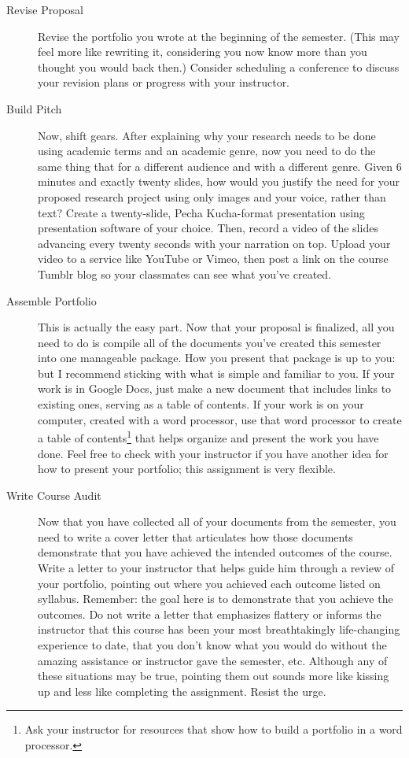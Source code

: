 \documentclass[11pt,oneside]{amsart}	%
\begin{document}
\begin{description}
	\item[Revise Proposal] Revise the portfolio you wrote at the beginning of the semester. (This may feel more like rewriting it, considering you now know more than you thought you would back then.) Consider scheduling a conference to discuss your revision plans or progress with your instructor.
	\item[Build Pitch] Now, shift gears. After explaining why your research needs to be done using academic terms and an academic genre, now you need to do the same thing that for a different audience and with a different genre. Given 6\textonehalf{} minutes and exactly twenty slides, how would you justify the need for your proposed research project using only images and your voice, rather than text? Create a twenty-slide, Pecha Kucha-format presentation using presentation software of your choice. Then, record a video of the slides advancing every twenty seconds with your narration on top. Upload your video to a service like YouTube or Vimeo, then post a link on the course Tumblr blog so your classmates can see what you've created.
	\item[Assemble Portfolio]  This is actually the easy part. Now that your proposal is finalized, all you need to do is compile all of the documents you've created this semester into one manageable package. How you present that package is up to you: but I recommend sticking with what is simple and familiar to you. If your work is in Google Docs, just make a new document that includes links to existing ones, serving as a table of contents. If your work is on your computer, created with a word processor, use that word processor to create a table of contents\footnote{Ask your instructor for resources that show how to build a portfolio in a word processor.} that helps organize and present the work you have done. Feel free to check with your instructor if you have another idea for how to present your portfolio; this assignment is very flexible.
	\item[Write Course Audit] Now that you have collected all of your documents from the semester, you need to write a cover letter that articulates how those documents demonstrate that you have achieved the intended outcomes of the course. Write a letter to your instructor that helps guide him through a review of your portfolio, pointing out where you achieved each outcome listed on syllabus. Remember: the goal here is to demonstrate that you achieve the outcomes. Do not write a letter that emphasizes flattery or informs the instructor that this course has been your most breathtakingly life-changing experience to date, that you don't know what you would do without the amazing assistance or instructor gave the semester, etc. Although any of these situations may be true, pointing them out sounds more like kissing up and less like completing the assignment. Resist the urge.
	

\end{description}
\end{document}

